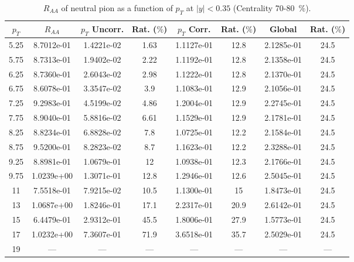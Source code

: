             
\begin{table}[!htb]
\centering
\begin{tabular}{|c|c|c|c|c|c|c|c|}
\hline
$p_{T}$ & $R_{AA}$ & $p_{T}$ Uncorr. & Rat. ($\%$) & $p_{T}$ Corr. & Rat. ($\%$) & Global & Rat. ($\%$)\\
\hline
5.25 & 8.7012e-01 & 1.4221e-02 & 1.63 & 1.1127e-01 & 12.8 & 2.1285e-01 & 24.5 \\ 
5.75 & 8.7313e-01 & 1.9402e-02 & 2.22 & 1.1192e-01 & 12.8 & 2.1358e-01 & 24.5 \\ 
6.25 & 8.7360e-01 & 2.6043e-02 & 2.98 & 1.1222e-01 & 12.8 & 2.1370e-01 & 24.5 \\ 
6.75 & 8.6078e-01 & 3.3547e-02 & 3.9 & 1.1083e-01 & 12.9 & 2.1056e-01 & 24.5 \\ 
7.25 & 9.2983e-01 & 4.5199e-02 & 4.86 & 1.2004e-01 & 12.9 & 2.2745e-01 & 24.5 \\ 
7.75 & 8.9040e-01 & 5.8816e-02 & 6.61 & 1.1529e-01 & 12.9 & 2.1781e-01 & 24.5 \\ 
8.25 & 8.8234e-01 & 6.8828e-02 & 7.8 & 1.0725e-01 & 12.2 & 2.1584e-01 & 24.5 \\ 
8.75 & 9.5200e-01 & 8.2823e-02 & 8.7 & 1.1623e-01 & 12.2 & 2.3288e-01 & 24.5 \\ 
9.25 & 8.8981e-01 & 1.0679e-01 & 12 & 1.0938e-01 & 12.3 & 2.1766e-01 & 24.5 \\ 
9.75 & 1.0239e+00 & 1.3071e-01 & 12.8 & 1.2946e-01 & 12.6 & 2.5045e-01 & 24.5 \\ 
11 & 7.5518e-01 & 7.9215e-02 & 10.5 & 1.1300e-01 & 15 & 1.8473e-01 & 24.5 \\ 
13 & 1.0687e+00 & 1.8246e-01 & 17.1 & 2.2317e-01 & 20.9 & 2.6142e-01 & 24.5 \\ 
15 & 6.4479e-01 & 2.9312e-01 & 45.5 & 1.8006e-01 & 27.9 & 1.5773e-01 & 24.5 \\ 
17 & 1.0232e+00 & 7.3607e-01 & 71.9 & 3.6518e-01 & 35.7 & 2.5029e-01 & 24.5 \\ 
19 & --- & --- & --- & --- & --- & --- & --- \\ 
\hline
\end{tabular}
\caption{$R_{AA}$ of neutral pion as a function of $p_{T}$ at $|y|<0.35$ (Centrality 70-80~$\%$).}
\end{table}
            
